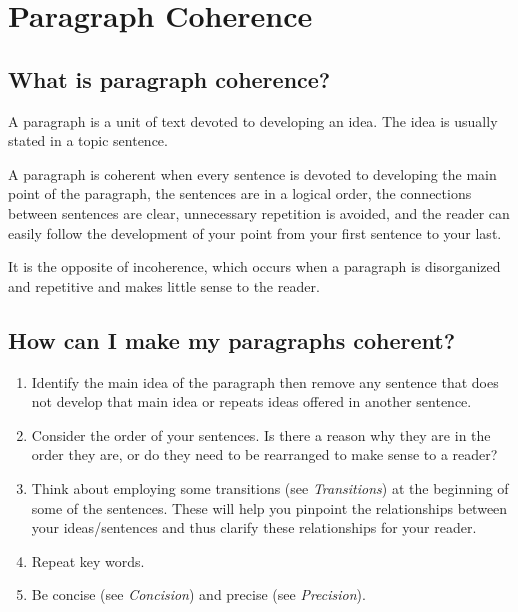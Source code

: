 
\chapter{Paragraph Coherence}

\section{What is paragraph coherence?}

A paragraph is a unit of text devoted to developing an idea. The idea is usually stated in a topic sentence.

A paragraph is coherent when every sentence is devoted to developing the main point of the paragraph, the sentences are in a logical order, the connections between sentences are clear, unnecessary repetition is avoided, and the reader can easily follow the development of your point from your first sentence to your last.

It is the opposite of incoherence, which occurs when a paragraph is disorganized and repetitive and makes little sense to the reader.

\section{How can I make my paragraphs coherent?}

\begin{enumerate}

\item Identify the main idea of the paragraph then remove any sentence that does not develop that main idea or repeats ideas offered in another sentence.

\item Consider the order of your sentences. Is there a reason why they are in the order they are, or do they need to be rearranged to make sense to a reader?

\item Think about employing some transitions (see \emph{Transitions}) at the beginning of some of the sentences. These will help you pinpoint the relationships between your ideas/sentences and thus clarify these relationships for your reader.

\item Repeat key words.

\item Be concise (see \emph {Concision}) and precise (see \emph{Precision}).
\end{enumerate}
 
